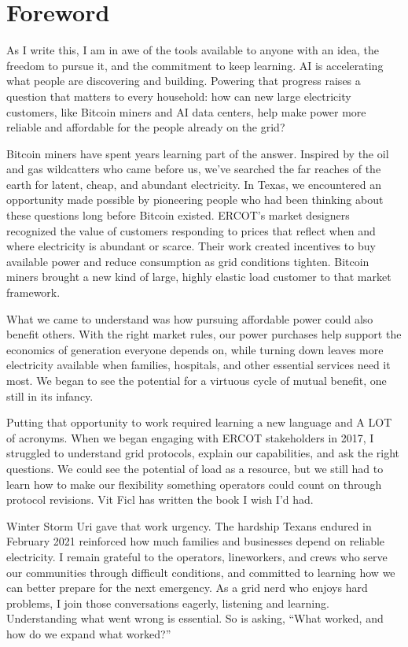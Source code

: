 \chapter*{Foreword}

As I write this, I am in awe of the tools available to anyone with an idea, the freedom to pursue it, and the commitment to keep learning. AI is accelerating what people are discovering and building. Powering that progress raises a question that matters to every household: how can new large electricity customers, like Bitcoin miners and AI data centers, help make power more reliable and affordable for the people already on the grid?

Bitcoin miners have spent years learning part of the answer. Inspired by the oil and gas wildcatters who came before us, we've searched the far reaches of the earth for latent, cheap, and abundant electricity. In Texas, we encountered an opportunity made possible by pioneering people who had been thinking about these questions long before Bitcoin existed. ERCOT's market designers recognized the value of customers responding to prices that reflect when and where electricity is abundant or scarce. Their work created incentives to buy available power and reduce consumption as grid conditions tighten. Bitcoin miners brought a new kind of large, highly elastic load customer to that market framework.

What we came to understand was how pursuing affordable power could also benefit others. With the right market rules, our power purchases help support the economics of generation everyone depends on, while turning down leaves more electricity available when families, hospitals, and other essential services need it most. We began to see the potential for a virtuous cycle of mutual benefit, one still in its infancy.

Putting that opportunity to work required learning a new language and A LOT of acronyms. When we began engaging with ERCOT stakeholders in 2017, I struggled to understand grid protocols, explain our capabilities, and ask the right questions. We could see the potential of load as a resource, but we still had to learn how to make our flexibility something operators could count on through protocol revisions. Vit Ficl has written the book I wish I'd had.

Winter Storm Uri gave that work urgency. The hardship Texans endured in February 2021 reinforced how much families and businesses depend on reliable electricity. I remain grateful to the operators, lineworkers, and crews who serve our communities through difficult conditions, and committed to learning how we can better prepare for the next emergency. As a grid nerd who enjoys hard problems, I join those conversations eagerly, listening and learning. Understanding what went wrong is essential. So is asking, ``What worked, and how do we expand what worked?''

